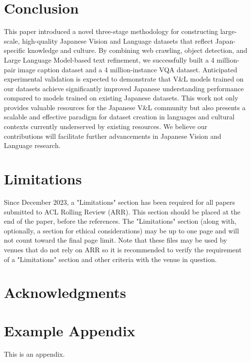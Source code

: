 \documentclass[11pt]{article}
\begin{document}
\section{Conclusion}
This paper introduced a novel three-stage methodology for constructing large-scale, high-quality Japanese Vision and Language datasets that reflect Japan-specific knowledge and culture. By combining web crawling, object detection, and Large Language Model-based text refinement, we successfully built a 4 million-pair image caption dataset and a 4 million-instance VQA dataset. Anticipated experimental validation is expected to demonstrate that V\&L models trained on our datasets achieve significantly improved Japanese understanding performance compared to models trained on existing Japanese datasets. This work not only provides valuable resources for the Japanese V\&L community but also presents a scalable and effective paradigm for dataset creation in languages and cultural contexts currently underserved by existing resources. We believe our contributions will facilitate further advancements in Japanese Vision and Language research.

\section*{Limitations}

Since December 2023, a "Limitations" section has been required for all papers submitted to ACL Rolling Review (ARR). This section should be placed at the end of the paper, before the references. The "Limitations" section (along with, optionally, a section for ethical considerations) may be up to one page and will not count toward the final page limit. Note that these files may be used by venues that do not rely on ARR so it is recommended to verify the requirement of a "Limitations" section and other criteria with the venue in question.

\section*{Acknowledgments}

%


\appendix

\section{Example Appendix}
\label{sec:appendix}

This is an appendix.
\end{document}
